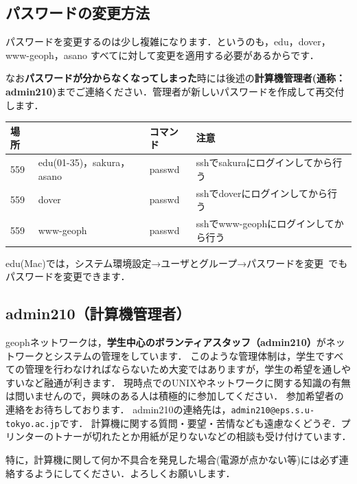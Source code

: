 \documentclass{jarticle}
\begin{document}
\subsection{パスワードの変更方法}
パスワードを変更するのは少し複雑になります．というのも，edu，dover，www-geoph，asano  すべてに対して変更を適用する必要があるからです．

なお{\bf パスワードが分からなくなってしまった}時には後述の{\bf 計算機管理者(通称：admin210)}までご連絡ください．管理者が新しいパスワードを作成して再交付します．

\begin{table}[H]
  \centering
  \begin{tabular}{|l|l|l|l|} \hline
    場所 & & コマンド & 注意 \\ \hline
    559 & edu(01-35)，sakura，asano & passwd & sshでsakuraにログインしてから行う \\ \hline
    559 & dover & passwd & sshでdoverにログインしてから行う  \\ \hline
    559 & www-geoph & passwd & sshでwww-geophにログインしてから行う  \\ \hline

  \end{tabular}
\end{table}
edu(Mac)では，システム環境設定→ユーザとグループ→パスワードを変更\ でもパスワードを変更できます．

\subsection{admin210（計算機管理者）}
geophネットワークは，{\bf 学生中心のボランティアスタッフ（admin210）}がネットワークとシステムの管理をしています．
このような管理体制は，学生ですべての管理を行わなければならないため大変ではありますが，学生の希望を通しやすいなど融通が利きます．
現時点でのUNIXやネットワークに関する知識の有無は問いませんので，興味のある人は積極的に参加してください．
参加希望者の連絡をお待ちしております．
admin210の連絡先は，\verb|admin210@eps.s.u-tokyo.ac.jp|です．
計算機に関する質問・要望・苦情なども遠慮なくどうぞ．プリンターのトナーが切れたとか用紙が足りないなどの相談も受け付けています．

特に，計算機に関して何か不具合を発見した場合(電源が点かない等)には必ず連絡するようにしてください．よろしくお願いします．

\end{document}
